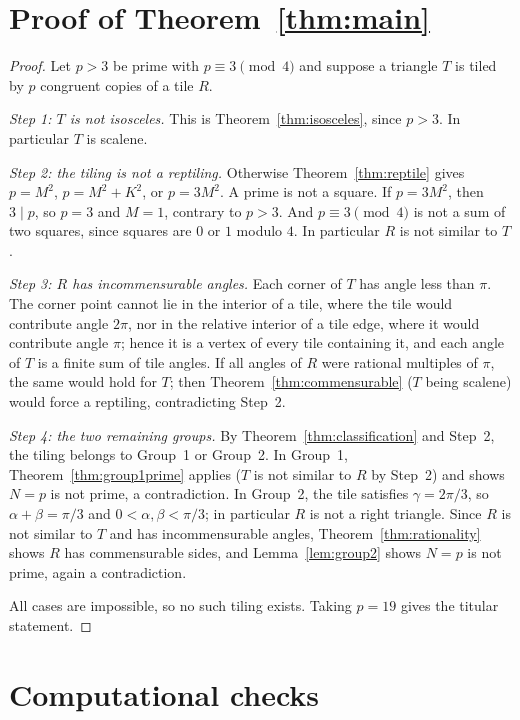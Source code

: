 \documentclass[11pt]{amsart}
\theoremstyle{remark}
\begin{document}
\section{Proof of Theorem~\ref{thm:main}}\label{sec:proof}

\begin{proof}
Let $p>3$ be prime with $p\equiv 3\pmod 4$ and suppose a triangle $T$ is tiled by $p$ congruent copies of a tile $R$.

\emph{Step 1: $T$ is not isosceles.} This is Theorem~\ref{thm:isosceles}, since $p>3$. In particular $T$ is scalene.

\emph{Step 2: the tiling is not a reptiling.} Otherwise Theorem~\ref{thm:reptile} gives $p=M^2$, $p=M^2+K^2$, or $p=3M^2$. A prime is not a square. If $p=3M^2$, then $3\mid p$, so $p=3$ and $M=1$, contrary to $p>3$. And $p\equiv 3\pmod 4$ is not a sum of two squares, since squares are $0$ or $1$ modulo $4$. In particular $R$ is not similar to $T$.

\emph{Step 3: $R$ has incommensurable angles.} Each corner of $T$ has angle less than $\pi$. The corner point cannot lie in the interior of a tile, where the tile would contribute angle $2\pi$, nor in the relative interior of a tile edge, where it would contribute angle $\pi$; hence it is a vertex of every tile containing it, and each angle of $T$ is a finite sum of tile angles. If all angles of $R$ were rational multiples of $\pi$, the same would hold for $T$; then Theorem~\ref{thm:commensurable} ($T$ being scalene) would force a reptiling, contradicting Step~2.

\emph{Step 4: the two remaining groups.} By Theorem~\ref{thm:classification} and Step~2, the tiling belongs to Group~1 or Group~2. In Group~1, Theorem~\ref{thm:group1prime} applies ($T$ is not similar to $R$ by Step~2) and shows $N=p$ is not prime, a contradiction. In Group~2, the tile satisfies $\gamma=2\pi/3$, so $\alpha+\beta=\pi/3$ and $0<\alpha,\beta<\pi/3$; in particular $R$ is not a right triangle. Since $R$ is not similar to $T$ and has incommensurable angles, Theorem~\ref{thm:rationality} shows $R$ has commensurable sides, and Lemma~\ref{lem:group2} shows $N=p$ is not prime, again a contradiction.

All cases are impossible, so no such tiling exists. Taking $p=19$ gives the titular statement.
\end{proof}

\section{Computational checks}\label{sec:verification}
\end{document}
